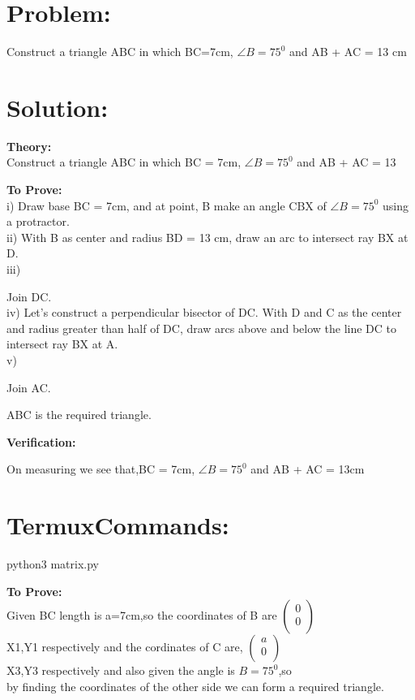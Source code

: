 \documentclass[10pt,a4paper]{report}
\begin{document}
\begin{multicols}{2}

\section{Problem:}  Construct a triangle ABC in which BC=7cm, $\angle{B}=75^0$ and AB + AC = 13 cm \vspace{3mm}
 \section{Solution: }
\raggedright \textbf{Theory:}\\
\centering Construct a triangle ABC in which BC = 7cm, $\angle{B}=75^0$ and AB + AC = 13 \\

\raggedright \textbf{To Prove:}\\
i) Draw base BC = 7cm, and at point, B make an angle CBX of $\angle{B}=75^0$ using \centering a protractor. \\ 
ii) With B as center and radius BD = 13 cm, draw an arc to intersect ray BX at D. \\
iii) \raggedright Join DC. \\
iv) Let's construct a perpendicular bisector of DC. With D and C as the center \centering and radius greater than half of DC, draw arcs above and below the line DC to intersect ray BX at A. \\
v) \raggedright Join AC. 

\centering ABC is the required triangle. 

\raggedright\textbf{Verification:} 

On measuring we see that,BC = 7cm, $\angle{B}=75^0$ and  AB + AC = 13cm  \\
   \section{TermuxCommands: } 
               \centering python3 matrix.py

\raggedright \textbf{To Prove:}\\
   Given BC length is a=7cm,so the coordinates of B are 
 $\begin{pmatrix}
  0\\
  0 \\
 \end{pmatrix}$%
 \\ X1,Y1 respectively and the cordinates of C are,
 $\begin{pmatrix}
  a\\
  0 \\
 \end{pmatrix}$%
 \\ X3,Y3 respectively and also given the angle is $B=75^0$,so \\ by finding the coordinates of the other side we can form a required triangle. \\


\end{multicols}
\end{document}
